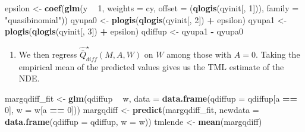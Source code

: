 \documentclass[
  12pt, krantz2,
]{book}
\makeatletter
\newenvironment{Shaded}{\begin{snugshade}}{\end{snugshade}}
\newcommand{\DataTypeTok}[1]{\textcolor[rgb]{0.13,0.29,0.53}{#1}}
\newcommand{\DecValTok}[1]{\textcolor[rgb]{0.00,0.00,0.81}{#1}}
\newcommand{\KeywordTok}[1]{\textcolor[rgb]{0.13,0.29,0.53}{\textbf{#1}}}
\newcommand{\NormalTok}[1]{#1}
\newcommand{\OperatorTok}[1]{\textcolor[rgb]{0.81,0.36,0.00}{\textbf{#1}}}
\newcommand{\StringTok}[1]{\textcolor[rgb]{0.31,0.60,0.02}{#1}}
\providecommand{\tightlist}{%
  \setlength{\itemsep}{0pt}\setlength{\parskip}{0pt}}
\newenvironment{kframe}{%
\medskip{}
\setlength{\fboxsep}{.8em}
 \def\at@end@of@kframe{}%
 \ifinner\ifhmode%
  \def\at@end@of@kframe{\end{minipage}}%
  \begin{minipage}{\columnwidth}%
 \fi\fi%
 \def\FrameCommand##1{\hskip\@totalleftmargin \hskip-\fboxsep
 \colorbox{shadecolor}{##1}\hskip-\fboxsep
     \hskip-\linewidth \hskip-\@totalleftmargin \hskip\columnwidth}%
 \MakeFramed {\advance\hsize-\width
   \@totalleftmargin\z@ \linewidth\hsize
   \@setminipage}}%
 {\par\unskip\endMakeFramed%
 \at@end@of@kframe}
\renewenvironment{Shaded}{\begin{kframe}}{\end{kframe}}
\theoremstyle{definition}
\theoremstyle{definition}
\theoremstyle{definition}
\newcommand{\1}{\mathbbm{1}}
\makeatother
\begin{document}
\begin{Shaded}
\begin{Highlighting}[]
\NormalTok{epsilon <-}\StringTok{ }\KeywordTok{coef}\NormalTok{(}\KeywordTok{glm}\NormalTok{(y }\OperatorTok{~}\StringTok{ }\DecValTok{1}\NormalTok{, }\DataTypeTok{weights =}\NormalTok{ cy, }\DataTypeTok{offset =}\NormalTok{ (}\KeywordTok{qlogis}\NormalTok{(qyinit[, }\DecValTok{1}\NormalTok{])),}
                    \DataTypeTok{family =} \StringTok{"quasibinomial"}\NormalTok{))}
\NormalTok{qyupa0 <-}\StringTok{ }\KeywordTok{plogis}\NormalTok{(}\KeywordTok{qlogis}\NormalTok{(qyinit[, }\DecValTok{2}\NormalTok{]) }\OperatorTok{+}\StringTok{ }\NormalTok{epsilon)}
\NormalTok{qyupa1 <-}\StringTok{ }\KeywordTok{plogis}\NormalTok{(}\KeywordTok{qlogis}\NormalTok{(qyinit[, }\DecValTok{3}\NormalTok{]) }\OperatorTok{+}\StringTok{ }\NormalTok{epsilon)}
\NormalTok{qdiffup <-}\StringTok{ }\NormalTok{qyupa1 }\OperatorTok{-}\StringTok{ }\NormalTok{qyupa0}
\end{Highlighting}
\end{Shaded}

\begin{enumerate}
\def\labelenumi{\arabic{enumi}.}
\setcounter{enumi}{5}
\tightlist
\item
  We then regress \(\hat{\bar{Q}}^{\star}_{diff}(M,A,W)\) on \(W\) among those
  with \(A=0\). Taking the empirical mean of the predicted values gives us the
  TML estimate of the NDE.
\end{enumerate}

\begin{Shaded}
\begin{Highlighting}[]
\NormalTok{margqdiff_fit <-}\StringTok{ }\KeywordTok{glm}\NormalTok{(qdiffup }\OperatorTok{~}\StringTok{ }\NormalTok{w,}
                     \DataTypeTok{data =} \KeywordTok{data.frame}\NormalTok{(}\DataTypeTok{qdiffup =}\NormalTok{ qdiffup[a }\OperatorTok{==}\StringTok{ }\DecValTok{0}\NormalTok{],}
                                       \DataTypeTok{w =}\NormalTok{ w[a }\OperatorTok{==}\StringTok{ }\DecValTok{0}\NormalTok{]))}
\NormalTok{margqdiff <-}\StringTok{ }\KeywordTok{predict}\NormalTok{(margqdiff_fit,}
                     \DataTypeTok{newdata =} \KeywordTok{data.frame}\NormalTok{(}\DataTypeTok{qdiffup =}\NormalTok{ qdiffup, }\DataTypeTok{w =}\NormalTok{ w))}
\NormalTok{tmlende <-}\StringTok{ }\KeywordTok{mean}\NormalTok{(margqdiff)}
\end{Highlighting}
\end{Shaded}
\end{document}
